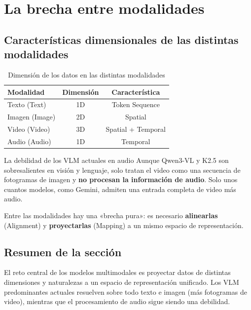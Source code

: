 \section{La brecha entre modalidades}

\subsection{Características dimensionales de las distintas modalidades}

\begin{table}[H]
\centering
\caption{Dimensión de los datos en las distintas modalidades}
\begin{tabular}{lcc}
\toprule
\textbf{Modalidad} & \textbf{Dimensión} & \textbf{Característica} \\
\midrule
Texto (Text) & 1D & Token Sequence \\
Imagen (Image) & 2D & Spatial \\
Video (Video) & 3D & Spatial + Temporal \\
Audio (Audio) & 1D & Temporal \\
\bottomrule
\end{tabular}
\end{table}

\begin{warningbox}{La debilidad de los VLM actuales en audio}
Aunque Qwen3-VL y K2.5 son sobresalientes en visión y lenguaje, solo tratan el video como una secuencia de fotogramas de imagen y \textbf{no procesan la información de audio}. Solo unos cuantos modelos, como Gemini, admiten una entrada completa de video más audio.
\end{warningbox}

Entre las modalidades hay una «brecha pura»: es necesario \textbf{alinearlas} (Alignment) y \textbf{proyectarlas} (Mapping) a un mismo espacio de representación.

\subsection{Resumen de la sección}

El reto central de los modelos multimodales es proyectar datos de distintas dimensiones y naturalezas a un espacio de representación unificado. Los VLM predominantes actuales resuelven sobre todo texto e imagen (más fotogramas de video), mientras que el procesamiento de audio sigue siendo una debilidad.
